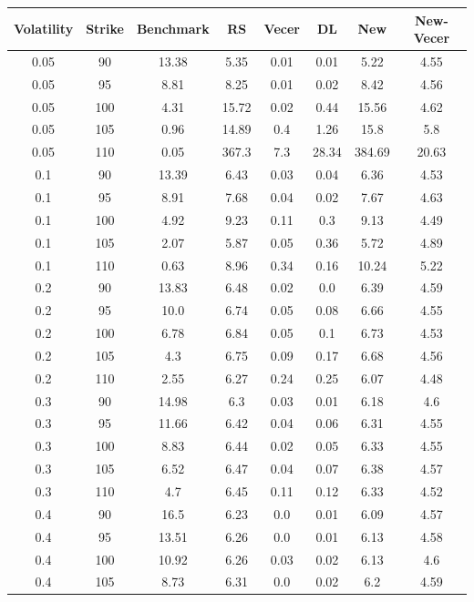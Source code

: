 \documentclass{article}
\begin{document}
\scriptsize
\begin{table}[H]
  \begin{tabular}{|c|c|c|c|c|c|c|c|}
  \hline
  Volatility & Strike & Benchmark & RS & Vecer & DL & New & New-Vecer \\
  \hline
  0.05 & 90 & 13.38 & 5.35 & 0.01 & 0.01 & 5.22 & 4.55 \\
  0.05 & 95 & 8.81 & 8.25 & 0.01 & 0.02 & 8.42 & 4.56 \\
  0.05 & 100 & 4.31 & 15.72 & 0.02 & 0.44 & 15.56 & 4.62 \\
  0.05 & 105 & 0.96 & 14.89 & 0.4 & 1.26 & 15.8 & 5.8 \\
  0.05 & 110 & 0.05 & 367.3 & 7.3 & 28.34 & 384.69 & 20.63 \\
  0.1 & 90 & 13.39 & 6.43 & 0.03 & 0.04 & 6.36 & 4.53 \\
  0.1 & 95 & 8.91 & 7.68 & 0.04 & 0.02 & 7.67 & 4.63 \\
  0.1 & 100 & 4.92 & 9.23 & 0.11 & 0.3 & 9.13 & 4.49 \\
  0.1 & 105 & 2.07 & 5.87 & 0.05 & 0.36 & 5.72 & 4.89 \\
  0.1 & 110 & 0.63 & 8.96 & 0.34 & 0.16 & 10.24 & 5.22 \\
  0.2 & 90 & 13.83 & 6.48 & 0.02 & 0.0 & 6.39 & 4.59 \\
  0.2 & 95 & 10.0 & 6.74 & 0.05 & 0.08 & 6.66 & 4.55 \\
  0.2 & 100 & 6.78 & 6.84 & 0.05 & 0.1 & 6.73 & 4.53 \\
  0.2 & 105 & 4.3 & 6.75 & 0.09 & 0.17 & 6.68 & 4.56 \\
  0.2 & 110 & 2.55 & 6.27 & 0.24 & 0.25 & 6.07 & 4.48 \\
  0.3 & 90 & 14.98 & 6.3 & 0.03 & 0.01 & 6.18 & 4.6 \\
  0.3 & 95 & 11.66 & 6.42 & 0.04 & 0.06 & 6.31 & 4.55 \\
  0.3 & 100 & 8.83 & 6.44 & 0.02 & 0.05 & 6.33 & 4.55 \\
  0.3 & 105 & 6.52 & 6.47 & 0.04 & 0.07 & 6.38 & 4.57 \\
  0.3 & 110 & 4.7 & 6.45 & 0.11 & 0.12 & 6.33 & 4.52 \\
  0.4 & 90 & 16.5 & 6.23 & 0.0 & 0.01 & 6.09 & 4.57 \\
  0.4 & 95 & 13.51 & 6.26 & 0.0 & 0.01 & 6.13 & 4.58 \\
  0.4 & 100 & 10.92 & 6.26 & 0.03 & 0.02 & 6.13 & 4.6 \\
  0.4 & 105 & 8.73 & 6.31 & 0.0 & 0.02 & 6.2 & 4.59 \\

\end{tabular}
\end{table}
\end{document}
